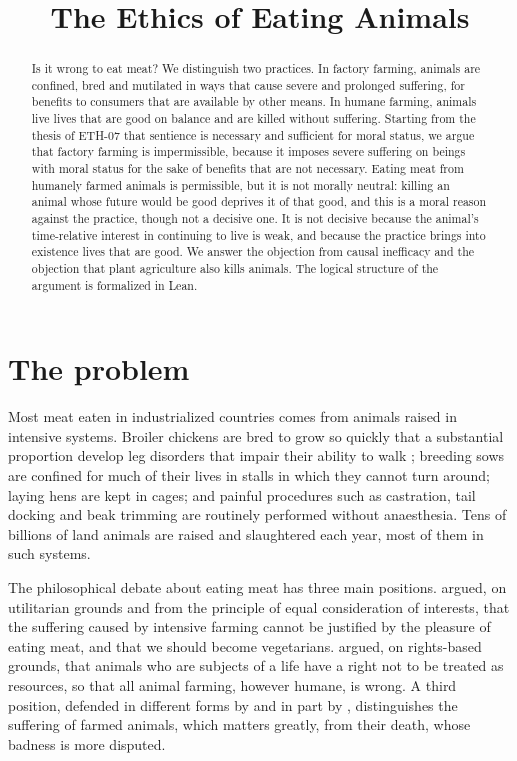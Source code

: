 \documentclass{situationist-preprint}
\title{The Ethics of Eating Animals}
\begin{document}
\maketitle

\begin{abstract}
Is it wrong to eat meat? We distinguish two practices. In factory farming, animals are confined, bred and mutilated in ways that cause severe and prolonged suffering, for benefits to consumers that are available by other means. In humane farming, animals live lives that are good on balance and are killed without suffering. Starting from the thesis of ETH-07 that sentience is necessary and sufficient for moral status, we argue that factory farming is impermissible, because it imposes severe suffering on beings with moral status for the sake of benefits that are not necessary. Eating meat from humanely farmed animals is permissible, but it is not morally neutral: killing an animal whose future would be good deprives it of that good, and this is a moral reason against the practice, though not a decisive one. It is not decisive because the animal's time-relative interest in continuing to live is weak, and because the practice brings into existence lives that are good. We answer the objection from causal inefficacy and the objection that plant agriculture also kills animals. The logical structure of the argument is formalized in Lean.
\end{abstract}

\section{The problem}

Most meat eaten in industrialized countries comes from animals raised in intensive systems. Broiler chickens are bred to grow so quickly that a substantial proportion develop leg disorders that impair their ability to walk \citep{Knowles2008}; breeding sows are confined for much of their lives in stalls in which they cannot turn around; laying hens are kept in cages; and painful procedures such as castration, tail docking and beak trimming are routinely performed without anaesthesia. Tens of billions of land animals are raised and slaughtered each year, most of them in such systems.

The philosophical debate about eating meat has three main positions. \citet{Singer1975} argued, on utilitarian grounds and from the principle of equal consideration of interests, that the suffering caused by intensive farming cannot be justified by the pleasure of eating meat, and that we should become vegetarians. \citet{Regan1983} argued, on rights-based grounds, that animals who are subjects of a life have a right not to be treated as resources, so that all animal farming, however humane, is wrong. A third position, defended in different forms by \citet{Fischer2020} and in part by \citet{Harman2011}, distinguishes the suffering of farmed animals, which matters greatly, from their death, whose badness is more disputed.
\end{document}
